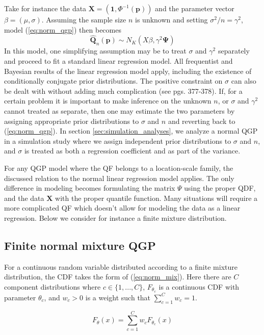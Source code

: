 \documentclass[preprint,12pt,authoryear]{elsarticle}
\newcommand{\1}[1]{\mathds{1}\left[#1\right]}
\begin{document}
Take for instance the data 
$\boldsymbol{X} = \left(\textbf{1}, \Phi^{-1}(\boldsymbol{p})\right)$ and the 
parameter vector $\beta = (\mu, \sigma)$. Assuming the sample size $n$ is 
unknown and setting $\sigma^2/n = \gamma^2$, model (\ref{eq:norm_qgp}) then 
becomes
\[
    \hat{\boldsymbol{Q}}_n(\boldsymbol{p}) \sim N_K\left(X\beta, 
\gamma^2 \boldsymbol{\Psi}\right)
\]
In this model, one simplifying assumption may be to treat $\sigma$ and 
$\gamma^2$ separately and proceed to fit a standard linear regression model. 
All frequentist and Bayesian results of the linear regression model apply, 
including the existence of conditionally conjugate prior distributions. The 
positive constraint on $\sigma$ can also be dealt with without adding much 
complication (see \cite{gelman2013bayesian} pgs. 377-378). 
If, for a certain problem it is important to make inference on the unknown $n$, or $\sigma$ and 
$\gamma^2$ cannot treated as separate, then one may estimate the two parameters 
by assigning appropriate prior distributions to $\sigma$ and $n$ and reverting 
back to (\ref{eq:norm_qgp}). In section \ref{sec:simulation_analyses}, we 
analyze a normal QGP in a simulation study where we assign independent prior 
distributions to $\sigma$ and $n$, and $\sigma$ is treated as both a regression 
coefficient and as part of the variance.



For any QGP model where the QF belongs to a location-scale family, the 
discussed relation to the normal linear regression model applies. The only 
difference in modeling becomes formulating the matrix $\Psi$ using the proper 
QDF, and the data $\boldsymbol{X}$ with the proper quantile function. Many 
situations will require a more complicated QF which doesn't allow for modeling 
the data as a linear regression. Below we consider for instance a finite 
mixture distribution. 

\subsection{Finite normal mixture QGP}

For a continuous random variable distributed according to a finite mixture 
distribution, the CDF takes the form of (\ref{eq:norm_mix}). Here there are $C$ 
component distributions where $c \in \{1, ..., C\}$, $F_{\theta_c}$ is a 
continuous CDF with parameter $\theta_c$, and $w_c > 0$ is a weight such that 
$\sum_{c = 1}^C w_c = 1$. 

\begin{equation}
    \label{eq:norm_mix}
    F_{\theta}(x) = \sum_{c = 1}^C w_c F_{\theta_c}(x)
\end{equation}
\end{document}
